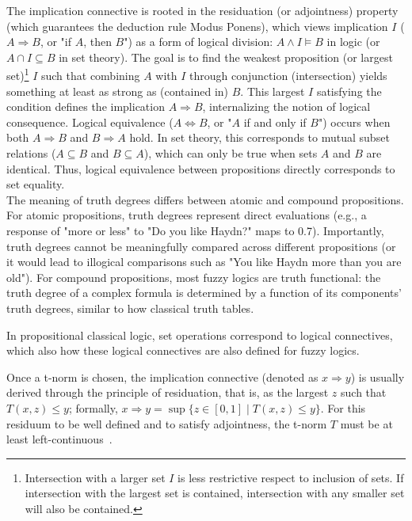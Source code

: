 The implication connective is rooted in the residuation (or adjointness) property (which guarantees the deduction rule Modus Ponens), which views implication $I$ ($A \Rightarrow B$, or "if $A$, then $B$") as a form of logical division: $A \land I \models B$ in logic (or $A \cap I \subseteq B$ in set theory). The goal is to find the weakest proposition (or largest set)\footnote{Intersection with a larger set $I$ is less restrictive respect to inclusion of sets. If intersection with the largest set is contained, intersection with any smaller set will also be contained.} $I$ such that combining $A$ with $I$ through conjunction (intersection) yields something at least as strong as (contained in) $B$. This largest $I$ satisfying the condition defines the implication $A \Rightarrow B$, internalizing the notion of logical consequence. Logical equivalence ($A \iff B$, or "$A$ if and only if $B$") occurs when both $A \Rightarrow B$ and $B \Rightarrow A$ hold. In set theory, this corresponds to mutual subset relations ($A \subseteq B$ and $B \subseteq A$), which can only be true when sets $A$ and $B$ are identical. Thus, logical equivalence between propositions directly corresponds to set equality.\\

The meaning of truth degrees differs between atomic and compound propositions. For atomic propositions, truth degrees represent direct evaluations (e.g., a response of "more or less" to "Do you like Haydn?" maps to 0.7). Importantly, truth degrees cannot be meaningfully compared across different propositions (or it would lead to illogical comparisons such as "You like Haydn more than you are old"). For compound propositions, most fuzzy logics are truth functional: the truth degree of a complex formula is determined by a function of its components' truth degrees, similar to how classical truth tables.\\

\begin{remark}
    In propositional classical logic, set operations correspond to logical connectives, which also how these logical connectives are also defined for fuzzy logics.
\end{remark}

 Once a t-norm is chosen, the implication connective (denoted as $x \Rightarrow y$) is usually derived through the principle of residuation, that is, as the largest $z$ such that $T(x, z) \le y$; formally, $x \Rightarrow y = \sup\{z \in [0,1] \mid T(x, z) \le y\}$. For this residuum to be well defined and to satisfy adjointness, the t-norm $T$ must be at least left-continuous~\cite[p.272]{GodoMonoidal}.\\

